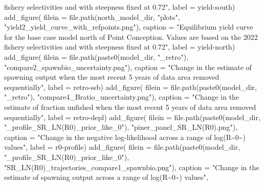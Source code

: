 \documentclass[
  letterpaper,
]{article}
\newenvironment{Shaded}{\begin{snugshade}}{\end{snugshade}}
\newcommand{\AttributeTok}[1]{\textcolor[rgb]{0.77,0.63,0.00}{#1}}
\newcommand{\FunctionTok}[1]{\textcolor[rgb]{0.00,0.00,0.00}{#1}}
\newcommand{\NormalTok}[1]{#1}
\newcommand{\StringTok}[1]{\textcolor[rgb]{0.31,0.60,0.02}{#1}}
\begin{document}
\begin{Shaded}
\begin{Highlighting}[]
\StringTok{fishery selectivities and with steepness fixed at 0.72"}\NormalTok{,}
\AttributeTok{label =} \StringTok{\textquotesingle{}yield{-}south\textquotesingle{}}\NormalTok{)}
\FunctionTok{add\_figure}\NormalTok{(}
\AttributeTok{filein =} \FunctionTok{file.path}\NormalTok{(north\_model\_dir, }\StringTok{"plots"}\NormalTok{, }\StringTok{"yield2\_yield\_curve\_with\_refpoints.png"}\NormalTok{), }
\AttributeTok{caption =} \StringTok{"Equilibrium yield curve for the base case model north of Point Conception. Values are based on the 2022}
\StringTok{fishery selectivities and with steepness fixed at 0.72"}\NormalTok{,}
\AttributeTok{label =} \StringTok{\textquotesingle{}yield{-}north\textquotesingle{}}\NormalTok{)}
\FunctionTok{add\_figure}\NormalTok{(}
\AttributeTok{filein =} \FunctionTok{file.path}\NormalTok{(}\FunctionTok{paste0}\NormalTok{(model\_dir, }\StringTok{"\_retro"}\NormalTok{),  }\StringTok{"compare2\_spawnbio\_uncertainty.png"}\NormalTok{), }
\AttributeTok{caption =} \StringTok{"Change in the estimate of spawning output when the most recent 5 years of data area removed sequentially"}\NormalTok{,}
\AttributeTok{label =} \StringTok{\textquotesingle{}retro{-}ssb\textquotesingle{}}\NormalTok{)}
\FunctionTok{add\_figure}\NormalTok{(}
\AttributeTok{filein =} \FunctionTok{file.path}\NormalTok{(}\FunctionTok{paste0}\NormalTok{(model\_dir, }\StringTok{"\_retro"}\NormalTok{),  }\StringTok{"compare4\_Bratio\_uncertainty.png"}\NormalTok{),}
\AttributeTok{caption =} \StringTok{"Change in the estimate of fraction unfished when the most recent 5 years of data area removed sequentially"}\NormalTok{,}
\AttributeTok{label =} \StringTok{\textquotesingle{}retro{-}depl\textquotesingle{}}\NormalTok{)}
\FunctionTok{add\_figure}\NormalTok{(}
\AttributeTok{filein =} \FunctionTok{file.path}\NormalTok{(}\FunctionTok{paste0}\NormalTok{(model\_dir, }\StringTok{"\_profile\_SR\_LN(R0)\_prior\_like\_0"}\NormalTok{),  }\StringTok{"piner\_panel\_SR\_LN(R0).png"}\NormalTok{), }
\AttributeTok{caption =} \StringTok{"Change in the negative log{-}likelihood across a range of log(R\textasciitilde{}0\textasciitilde{}) values"}\NormalTok{,}
\AttributeTok{label =} \StringTok{\textquotesingle{}r0{-}profile\textquotesingle{}}\NormalTok{)}
\FunctionTok{add\_figure}\NormalTok{(}
\AttributeTok{filein =} \FunctionTok{file.path}\NormalTok{(}\FunctionTok{paste0}\NormalTok{(model\_dir, }\StringTok{"\_profile\_SR\_LN(R0)\_prior\_like\_0"}\NormalTok{),  }\StringTok{"SR\_LN(R0)\_trajectories\_compare1\_spawnbio.png"}\NormalTok{), }
\AttributeTok{caption =} \StringTok{"Change in the estimate of spawning output across a range of log(R\textasciitilde{}0\textasciitilde{}) values"}\NormalTok{,}

\end{Highlighting}
\end{Shaded}
\end{document}
